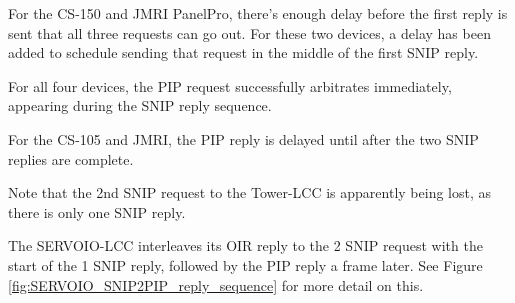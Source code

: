 \documentclass[11pt]{article}
\begin{document}
For the CS-150 and JMRI PanelPro, there's enough delay before the first reply is 
sent that all three requests can go out.  
For these two devices, a delay has been added to schedule sending that 
request in the middle of the first SNIP reply.

For all four devices,  
the PIP request successfully arbitrates immediately, appearing during the 
SNIP reply sequence. 

For the CS-105 and JMRI,
the PIP reply is delayed until after the two SNIP replies are complete.

Note that the 2nd SNIP request to the Tower-LCC is apparently
being lost, as there is only one SNIP reply.

The SERVOIO-LCC interleaves its OIR reply to the 2 SNIP request
with the start of the 1 SNIP reply, followed by the PIP reply 
a frame later.
See Figure \ref{fig:SERVOIO_SNIP2PIP_reply_sequence} for more detail on this.
\end{document}
